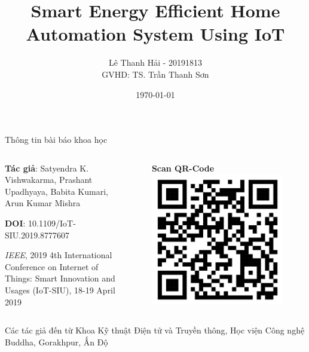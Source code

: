 \documentclass[11pt]{beamer}
\title{Smart Energy Efficient Home Automation System Using IoT}
\author{Lê Thanh Hải - 20191813\\GVHD: TS. Trần Thanh Sơn\\[20pt]}
\date{\today}
\renewcommand{\label}[1]{%
			\gdef\sfname{sf:##1}}%
\begin{document}

	\begin{frame}
		\titlepage
	\end{frame}



	\begin{frame}[t]{Thông tin bài báo khoa học} \vspace{4pt}
		\begin{columns}
			
			\begin{column}{0.5\textwidth}
				\textbf{Tác giả}: Satyendra K. Vishwakarma, Prashant Upadhyaya, Babita Kumari, Arun Kumar Mishra
				
				\vspace{4pt}
				\textbf{DOI}: 10.1109/IoT-SIU.2019.8777607
				
				\vspace{7pt}
				\emph{IEEE}, 2019 4th International Conference on Internet of Things: Smart Innovation and Usages (IoT-SIU), 18-19 April 2019
				
			\end{column}
		
			\begin{column}{0.5\textwidth}  %
				\begin{center}
					\begin{figure}[h]
						\textbf{Scan QR-Code}
						\includegraphics[width=1\textwidth]{Image/IoT_QR.png}
					\end{figure}
				\end{center}
			\end{column}
		\end{columns}
		Các tác giả đến từ Khoa Kỹ thuật Điện tử và Truyền thông, Học viện Công nghệ Buddha, Gorakhpur, Ấn Độ
	\end{frame}
\end{document}
